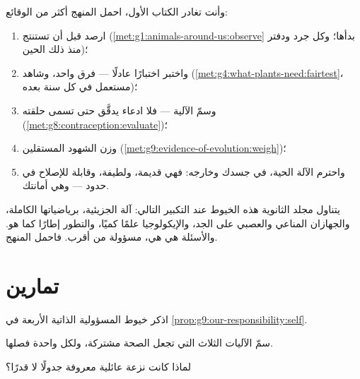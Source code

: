 \begin{method}\label{met:g9:our-responsibility:method}
وأنت تغادر الكتاب الأول، احمل المنهج أكثر من الوقائع:
\begin{enumerate}
  \item ارصد قبل أن تستنتج
        (\cref{met:g1:animals-around-us:observe} بدأها؛
        وكل جرد ودفتر منذ ذلك الحين)؛
  \item واختبر اختبارًا عادلًا --- فرق واحد، وشاهد
        (\cref{met:g4:what-plants-need:fairtest}،
        مستعمل في كل سنة بعده)؛
  \item وسمّ الآلية --- فلا ادعاء يدقَّق حتى تسمى حلقته
        (\cref{met:g8:contraception:evaluate})؛
  \item وزن الشهود المستقلين
        (\cref{met:g9:evidence-of-evolution:weigh})؛
  \item واحترم الآلة الحية، في جسدك وخارجه: فهي قديمة،
        ولطيفة، وقابلة للإصلاح في حدود --- وهي أمانتك.
\end{enumerate}
\end{method}

\begin{remark}\label{rem:g9:our-responsibility:next}
يتناول مجلد الثانوية هذه الخيوط عند التكبير التالي: آلة
 الجزيئية،  برياضياتها الكاملة، والجهازان
المناعي والعصبي على الجد، والإيكولوجيا علمًا كميًا،
والتطور إطارًا كما هو. والأسئلة هي هي، مسؤولة من أقرب.
فاحمل المنهج.
\end{remark}

\section{تمارين}

\begin{exercise}[$\star$]\label{exo:g9:our-responsibility:1}
اذكر خيوط المسؤولية الذاتية الأربعة في
\cref{prop:g9:our-responsibility:self}.
\end{exercise}

\begin{exercise}[$\star$]\label{exo:g9:our-responsibility:2}
سمّ الآليات الثلاث التي تجعل الصحة مشتركة، ولكل واحدة
فصلها.
\end{exercise}

\begin{exercise}[$\star$]\label{exo:g9:our-responsibility:3}
لماذا كانت نزعة عائلية معروفة جدولًا لا قدرًا؟
\end{exercise}

